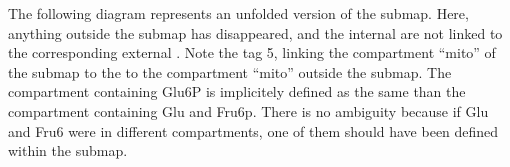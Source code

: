 The following diagram represents an unfolded version of the submap. Here, anything outside the submap has disappeared, and the internal  are not linked to the corresponding external . Note the tag 5, linking the compartment ``mito'' of the submap to the to the compartment ``mito'' outside the submap. The compartment containing Glu6P is implicitely defined as the same than the compartment containing Glu and Fru6p. There is no ambiguity because if Glu and Fru6 were in different compartments, one of them should have been defined within the submap.

\begin{center}
\end{center}



